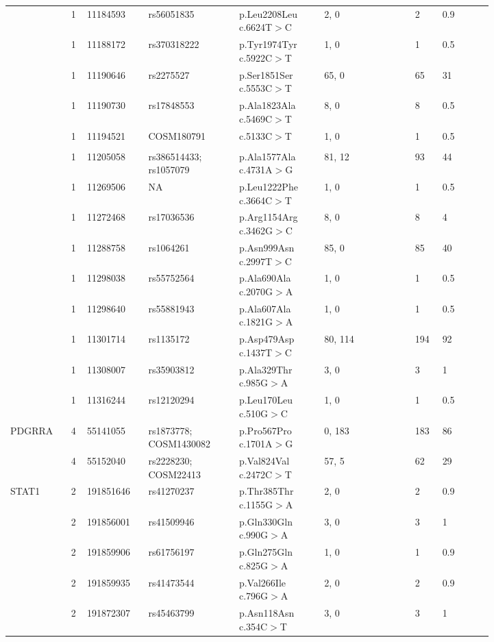 \begin{longtable}{p{0.1\linewidth}|p{0.02\linewidth}p{0.1\linewidth}p{0.16\linewidth}p{0.15\linewidth}p{0.16\linewidth}p{0.04\linewidth}p{0.09\linewidth}}
		\\
		& 1 & 11184593 & rs56051835 & p.Leu2208Leu c.6624T$>$C & 2, 0 & 2 & 0.9
		\\
		& 1 & 11188172 & rs370318222 & p.Tyr1974Tyr c.5922C$>$T & 1, 0 & 1 & 0.5
		\\
		& 1 & 11190646 & rs2275527 & p.Ser1851Ser c.5553C$>$T & 65, 0 & 65 & 31
		\\
		& 1 & 11190730 & rs17848553 & p.Ala1823Ala c.5469C$>$T & 8, 0 & 8 & 0.5
		\\
		& 1 & 11194521 & COSM180791 & c.5133C$>$T & 1, 0 & 1 & 0.5
		\\
		\\
		& 1 & 11205058 & rs386514433; rs1057079 & p.Ala1577Ala c.4731A$>$G & 81, 12 & 93 & 44
		\\
		& 1 & 11269506 & NA & p.Leu1222Phe c.3664C$>$T & 1, 0 & 1 & 0.5
		\\
		& 1 & 11272468 & rs17036536 & p.Arg1154Arg c.3462G$>$C & 8, 0 & 8 & 4
		\\
		& 1 & 11288758 & rs1064261 & p.Asn999Asn c.2997T$>$C & 85, 0 & 85 & 40
		\\
		& 1 & 11298038 & rs55752564 & p.Ala690Ala c.2070G$>$A & 1, 0 & 1 & 0.5
		\\
		& 1 & 11298640 & rs55881943 & p.Ala607Ala c.1821G$>$A & 1, 0 & 1 & 0.5
		\\
		& 1 & 11301714 & rs1135172 & p.Asp479Asp c.1437T$>$C & 80, 114 & 194 & 92
		\\
		& 1 & 11308007 & rs35903812 & p.Ala329Thr c.985G$>$A & 3, 0 & 3 & 1
		\\
		& 1 & 11316244 & rs12120294 & p.Leu170Leu c.510G$>$C & 1, 0 & 1 & 0.5
		\\
		\hline
		PDGRRA & 4 & 55141055 & rs1873778; COSM1430082 & p.Pro567Pro c.1701A$>$G & 0, 183 & 183 & 86
		\\
		& 4 & 55152040 & rs2228230; COSM22413 & p.Val824Val c.2472C$>$T & 57, 5 & 62 & 29
		\\
		\hline
		STAT1 & 2 & 191851646 & rs41270237 & p.Thr385Thr c.1155G$>$A & 2, 0 & 2 & 0.9
		\\
		& 2 & 191856001 & rs41509946 & p.Gln330Gln c.990G$>$A & 3, 0 & 3 & 1
		\\
		& 2 & 191859906 & rs61756197 & p.Gln275Gln c.825G$>$A & 1, 0 & 1 & 0.9
		\\
		& 2 & 191859935 & rs41473544 & p.Val266Ile c.796G$>$A & 2, 0 & 2 & 0.9
		\\
		& 2 & 191872307 & rs45463799 & p.Asn118Asn c.354C$>$T & 3, 0 & 3 & 1
		\\

\end{longtable}
